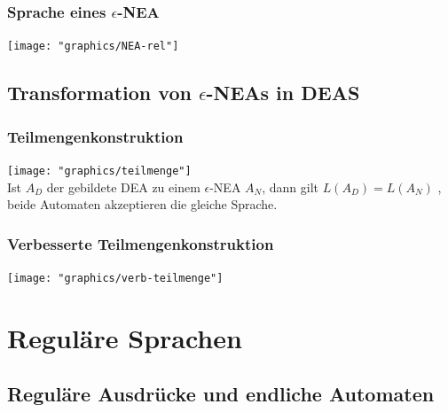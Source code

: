 \documentclass{scrreprt}
\begin{document}
\subsection{Sprache eines $\epsilon$-NEA}
\texttt{[image: "graphics/NEA-rel"]}
\section{Transformation von $\epsilon$-NEAs in DEAS}
\subsection{Teilmengenkonstruktion}
\texttt{[image: "graphics/teilmenge"]}
\\Ist $A_{D}$ der gebildete DEA zu einem $\epsilon$-NEA $A_{N}$, dann gilt $L(A_{D})=L(A_{N})$ , beide Automaten akzeptieren die gleiche Sprache.
\subsection{Verbesserte Teilmengenkonstruktion}
\texttt{[image: "graphics/verb-teilmenge"]}
\pagebreak
\chapter{Reguläre Sprachen}
\section{Reguläre Ausdrücke und endliche Automaten}
\end{document}
